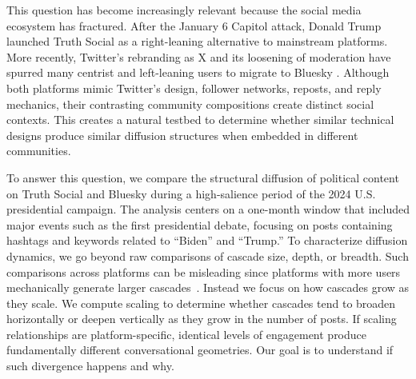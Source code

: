 \documentclass[letterpaper]{article} %
\newcommand{\rev}[1]{{\color{blue}#1}}
\begin{document}

This question has become increasingly relevant because the social media ecosystem has fractured. After the January 6 Capitol attack, Donald Trump launched Truth Social as a right-leaning alternative to mainstream platforms. More recently, Twitter's rebranding as X and its loosening of moderation have spurred many centrist and left-leaning users to migrate to Bluesky \cite{gerard_truth_2023, failla_im_2024, quelle_bluesky_2024}. Although both platforms mimic Twitter's design, follower networks, reposts, and reply mechanics, their contrasting community compositions create distinct social contexts. 
This creates a natural testbed to determine whether similar technical designs produce similar diffusion structures when embedded in different communities.

To answer this question, we compare the structural diffusion of political content on Truth Social and Bluesky during a high-salience period of the 2024 U.S. presidential campaign. The analysis centers on a one-month window that included major events such as the first presidential debate, focusing on posts containing hashtags and keywords related to ``Biden'' and ``Trump.'' 
To characterize diffusion dynamics, we go beyond raw comparisons of cascade size, depth, or breadth. Such comparisons across platforms can be misleading since platforms with more users mechanically generate larger cascades~\citep{juul_comparing_2021}. Instead we focus on how cascades grow as they scale. \rev{We compute scaling to determine whether cascades tend to broaden horizontally or deepen vertically as they grow in the number of posts.} If scaling relationships are platform-specific, identical levels of engagement produce fundamentally different conversational geometries. Our goal is to understand if such divergence happens and why.
\end{document}

